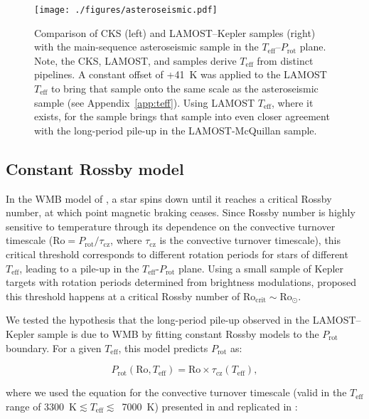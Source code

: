 \documentclass[linenumbers,tighten,trackchanges,twocolumn]{aastex631}
\newcommand{\teff}{\ensuremath{T_{\mathrm{eff}}}\xspace}
\newcommand{\prot}{\ensuremath{P_\mathrm{rot}}\xspace}
\begin{document}
\begin{figure}
    \centering
    \texttt{[image: ./figures/asteroseismic.pdf]}
    \caption{Comparison of CKS (left) and LAMOST--Kepler samples (right) with the \citet{Hall2021} main-sequence asteroseismic sample in the \teff--\prot plane. Note, the CKS, LAMOST, and \citet{Hall2021} samples derive \teff from distinct pipelines. A constant offset of +41~K was applied to the LAMOST \teff to bring that sample onto the same scale as the asteroseismic sample (see Appendix~\ref{app:teff}). Using LAMOST \teff, where it exists, for the \citet{Hall2021} sample brings that sample into even closer agreement with the long-period pile-up in the LAMOST-McQuillan sample.}
    \label{fig:asteroseismic}
\end{figure}

\subsection{Constant Rossby model}
\label{subsec:rossby}
In the WMB model of \citet{vanSaders2016, vanSaders2019}, a star spins down until it reaches a critical Rossby number, at which point magnetic braking ceases. Since Rossby number is highly sensitive to temperature through its dependence on the convective turnover timescale ($\mathrm{Ro} = P_\mathrm{rot}/\tau_\mathrm{cz}$, where $\tau_\mathrm{cz}$ is the convective turnover timescale), this critical threshold corresponds to different rotation periods for stars of different \teff, leading to a pile-up in the \teff-\prot plane. Using a small sample of Kepler targets with rotation periods determined from brightness modulations, \citet{vanSaders2016} proposed this threshold happens at a critical Rossby number of $\mathrm{Ro_{crit}} \sim \mathrm{Ro_\odot}$. 

We tested the hypothesis that the long-period pile-up observed in the LAMOST--Kepler sample is due to WMB by fitting constant Rossby models to the \prot boundary. For a given \teff, this model predicts \prot as: 

\begin{equation} \label{eq:1}
    \prot (\mathrm{Ro}, \teff) = \mathrm{Ro} \times \tau_\mathrm{cz}(\teff),
\end{equation}

where we used the equation for the convective turnover timescale (valid in the \teff range of 3300~K$\lesssim \teff \lesssim$~7000~K) presented in \citet{Gunn1998} and replicated in \citet{CranmerSaar2011}:
\end{document}
